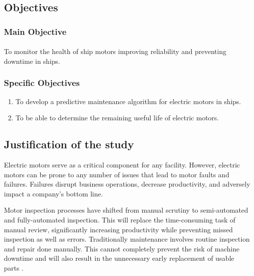 \subsection{Objectives}
\subsubsection{Main Objective}
\paragraph{}  To monitor the health of ship motors improving reliability and preventing downtime
in ships. 
\subsubsection{Specific Objectives}
\begin{enumerate}
\item  To develop a predictive maintenance algorithm for electric motors in ships.
\item To be able to determine the remaining useful life of electric motors. 

\end{enumerate}
\subsection{Justification of the study}
Electric motors serve as a critical component for any facility. However, electric motors can be prone to any number of issues that lead to motor faults and failures. Failures disrupt business operations, decrease productivity, and adversely impact a company’s bottom line. 

Motor inspection processes have shifted from manual scrutiny to semi-automated and fully-automated inspection. This will replace the time-consuming task of manual review, significantly increasing productivity while preventing missed inspection as well as errors. Traditionally maintenance involves routine inspection and repair done manually. This cannot completely prevent the risk of machine downtime and will also result in the unnecessary early replacement of usable parts \cite{sampaio_prediction_2019}.  


